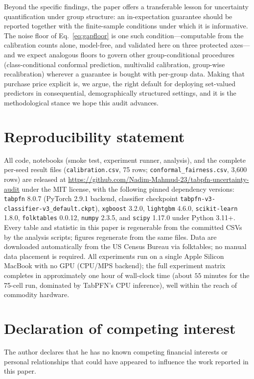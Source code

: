 \documentclass[review,12pt]{elsarticle}
\begin{document}
Beyond the specific findings, the paper offers a transferable lesson for uncertainty quantification under group structure: an in-expectation guarantee should be reported together with the finite-sample conditions under which it is informative. The noise floor of Eq.~\eqref{eq:gapfloor} is one such condition---computable from the calibration counts alone, model-free, and validated here on three protected axes---and we expect analogous floors to govern other group-conditional procedures (class-conditional conformal prediction, multivalid calibration, group-wise recalibration) wherever a guarantee is bought with per-group data. Making that purchase price explicit is, we argue, the right default for deploying set-valued predictors in consequential, demographically structured settings, and it is the methodological stance we hope this audit advances.

\section*{Reproducibility statement}
All code, notebooks (smoke test, experiment runner, analysis), and the complete per-seed result files (\texttt{calibration.csv}, 75 rows; \texttt{conformal\_fairness.csv}, 3{,}600 rows) are released at \url{https://github.com/Nadim-Mahmud-23/tabpfn-uncertainty-audit} under the MIT license, with the following pinned dependency versions: \texttt{tabpfn} 8.0.7 (PyTorch 2.9.1 backend, classifier checkpoint \texttt{tabpfn-v3-classifier-v3\_default.ckpt}), \texttt{xgboost} 3.2.0, \texttt{lightgbm} 4.6.0, \texttt{scikit-learn} 1.8.0, \texttt{folktables} 0.0.12, \texttt{numpy} 2.3.5, and \texttt{scipy} 1.17.0 under Python 3.11+. Every table and statistic in this paper is regenerable from the committed CSVs by the analysis scripts; figures regenerate from the same files. Data are downloaded automatically from the US Census Bureau via folktables; no manual data placement is required. All experiments run on a single Apple Silicon MacBook with no GPU (CPU/MPS backend); the full experiment matrix completes in approximately one hour of wall-clock time (about $55$ minutes for the 75-cell run, dominated by TabPFN's CPU inference), well within the reach of commodity hardware.

\section*{Declaration of competing interest}
The author declares that he has no known competing financial interests or personal relationships that could have appeared to influence the work reported in this paper.
\end{document}
